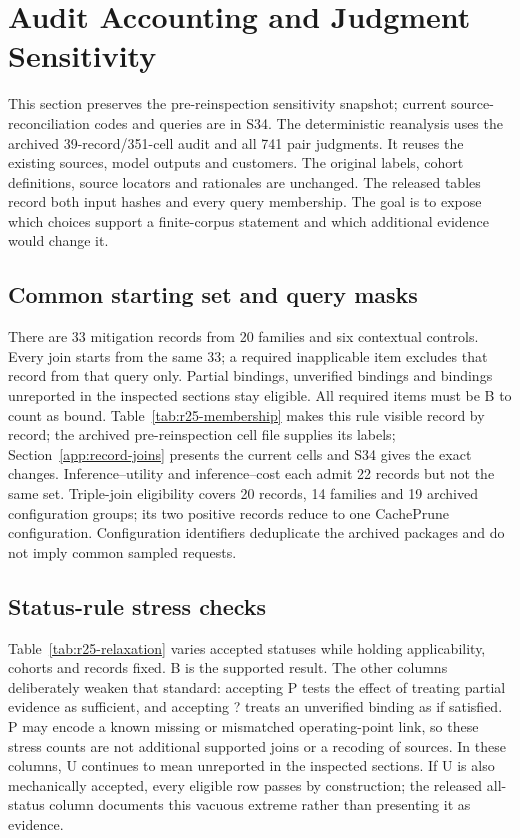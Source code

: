 \section{Audit Accounting and Judgment Sensitivity}\label{app:audit-sensitivity}
This section preserves the pre-reinspection sensitivity snapshot; current source-reconciliation codes and queries are in S34. The deterministic reanalysis uses the archived 39-record/351-cell audit and all 741 pair judgments. It reuses the existing sources, model outputs and customers. The original labels, cohort definitions, source locators and rationales are unchanged. The released tables record both input hashes and every query membership. The goal is to expose which choices support a finite-corpus statement and which additional evidence would change it.

\subsection{Common starting set and query masks}
There are 33 mitigation records from 20 families and six contextual controls. Every join starts from the same 33; a required inapplicable item excludes that record from that query only. Partial bindings, unverified bindings and bindings unreported in the inspected sections stay eligible. All required items must be B to count as bound. Table~\ref{tab:r25-membership} makes this rule visible record by record; the archived pre-reinspection cell file supplies its labels; Section~\ref{app:record-joins} presents the current cells and S34 gives the exact changes. Inference--utility and inference--cost each admit 22 records but not the same set. Triple-join eligibility covers 20 records, 14 families and 19 archived configuration groups; its two positive records reduce to one CachePrune configuration. Configuration identifiers deduplicate the archived packages and do not imply common sampled requests.

\subsection{Status-rule stress checks}
Table~\ref{tab:r25-relaxation} varies accepted statuses while holding applicability, cohorts and records fixed. B is the supported result. The other columns deliberately weaken that standard: accepting P tests the effect of treating partial evidence as sufficient, and accepting ? treats an unverified binding as if satisfied. P may encode a known missing or mismatched operating-point link, so these stress counts are not additional supported joins or a recoding of sources. In these columns, U continues to mean unreported in the inspected sections. If U is also mechanically accepted, every eligible row passes by construction; the released all-status column documents this vacuous extreme rather than presenting it as evidence.

